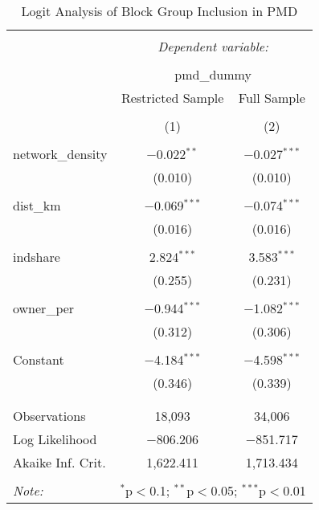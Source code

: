 
\begin{table}[!htbp] \centering 
  \caption{Logit Analysis of Block Group Inclusion in PMD} 
  \label{} 
\begin{tabular}{@{\extracolsep{5pt}}lcc} 
\\[-1.8ex]\hline 
\hline \\[-1.8ex] 
 & \multicolumn{2}{c}{\textit{Dependent variable:}} \\ 
\cline{2-3} 
\\[-1.8ex] & \multicolumn{2}{c}{pmd\_dummy} \\ 
 & Restricted Sample & Full Sample \\ 
\\[-1.8ex] & (1) & (2)\\ 
\hline \\[-1.8ex] 
 network\_density & $-$0.022$^{**}$ & $-$0.027$^{***}$ \\ 
  & (0.010) & (0.010) \\ 
  & & \\ 
 dist\_km & $-$0.069$^{***}$ & $-$0.074$^{***}$ \\ 
  & (0.016) & (0.016) \\ 
  & & \\ 
 indshare & 2.824$^{***}$ & 3.583$^{***}$ \\ 
  & (0.255) & (0.231) \\ 
  & & \\ 
 owner\_per & $-$0.944$^{***}$ & $-$1.082$^{***}$ \\ 
  & (0.312) & (0.306) \\ 
  & & \\ 
 Constant & $-$4.184$^{***}$ & $-$4.598$^{***}$ \\ 
  & (0.346) & (0.339) \\ 
  & & \\ 
\hline \\[-1.8ex] 
Observations & 18,093 & 34,006 \\ 
Log Likelihood & $-$806.206 & $-$851.717 \\ 
Akaike Inf. Crit. & 1,622.411 & 1,713.434 \\ 
\hline 
\hline \\[-1.8ex] 
\textit{Note:}  & \multicolumn{2}{r}{$^{*}$p$<$0.1; $^{**}$p$<$0.05; $^{***}$p$<$0.01} \\ 
\end{tabular} 
\end{table} 
